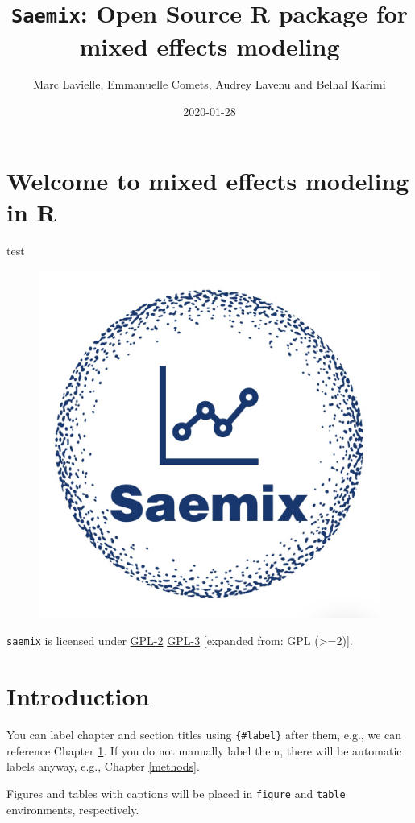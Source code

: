 \documentclass[]{book}
\title{\texttt{Saemix}: Open Source R package for mixed effects modeling}
\author{Marc Lavielle, Emmanuelle Comets, Audrey Lavenu and Belhal Karimi}
\date{2020-01-28}
\begin{document}
\maketitle

{
\hypersetup{linkcolor=black}
\setcounter{tocdepth}{1}
\tableofcontents
}
\chapter*{Welcome to mixed effects modeling in
R}\label{welcome-to-mixed-effects-modeling-in-r}

test

\begin{figure}

{\centering \includegraphics[width=0.6\linewidth]{figures/logo1} 

}

\end{figure}

\texttt{saemix} is licensed under
\href{https://cran.r-project.org/web/licenses/GPL-2}{GPL-2} \textbar{}
\href{https://cran.r-project.org/web/licenses/GPL-3}{GPL-3} {[}expanded
from: GPL (\textgreater{}=2){]}.

\chapter{Introduction}\label{intro}

You can label chapter and section titles using \texttt{\{\#label\}}
after them, e.g., we can reference Chapter \ref{intro}. If you do not
manually label them, there will be automatic labels anyway, e.g.,
Chapter \ref{methods}.

Figures and tables with captions will be placed in \texttt{figure} and
\texttt{table} environments, respectively.
\end{document}
